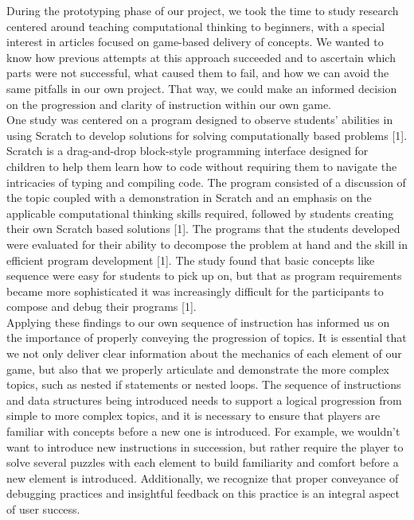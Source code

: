 During the prototyping phase of our project, we took the time to study research 
centered around teaching computational thinking to beginners, with a special interest 
in articles focused on game-based delivery of concepts. We wanted to know how 
previous attempts at this approach succeeded and to ascertain which parts were 
not successful, what caused them to fail, and how we can avoid the same pitfalls 
in our own project. That way, we could make an informed decision on the 
progression and clarity of instruction within our own game.\\

One study was centered on a program designed to observe students’ abilities in 
using Scratch to develop solutions for solving computationally based problems [1]. 
Scratch is a drag-and-drop block-style programming interface designed for children 
to help them learn how to code without requiring them to navigate the intricacies of 
typing and compiling code. The program consisted of a discussion of the topic 
coupled with a demonstration in Scratch and an emphasis on the applicable 
computational thinking skills required, followed by students creating their own 
Scratch based solutions [1]. The programs that the students developed were evaluated 
for their ability to decompose the problem at hand and the skill in efficient program 
development [1]. The study found that basic concepts like sequence were easy for 
students to pick up on, but that as program requirements became more sophisticated
 it was increasingly difficult for the participants to compose and debug their programs [1].\\

Applying these findings to our own sequence of instruction has informed us on the 
importance of properly conveying the progression of topics. It is essential that we 
not only deliver clear information about the mechanics of each element of our game, 
but also that we properly articulate and demonstrate the more complex topics, such 
as nested if statements or nested loops. The sequence of instructions and data structures 
being introduced needs to support a logical progression from simple to more complex 
topics, and it is necessary to ensure that players are familiar with concepts before a new 
one is introduced. For example, we wouldn’t want to introduce new instructions in 
succession, but rather require the player to solve several puzzles with each element to 
build familiarity and comfort before a new element is introduced.  Additionally, we 
recognize that proper conveyance of debugging practices and insightful feedback 
on this practice is an integral aspect of user success.\\

